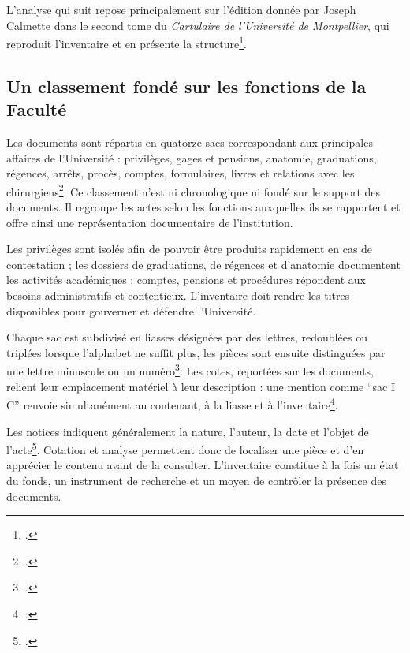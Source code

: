 L'analyse qui suit repose principalement sur l'édition donnée par Joseph Calmette dans le second tome du \emph{Cartulaire de l'Université de Montpellier}, qui reproduit l'inventaire et en présente la structure\footcite[p.~XXII--XXIX et p.~1--206, vues~41 à 51 et 187 à 394 de la version numérisée]{CalmetteCartulaire1912}.

\subsection{Un classement fondé sur les fonctions de la Faculté}

Les documents sont répartis en quatorze sacs correspondant aux principales affaires de l'Université : privilèges, gages et pensions, anatomie, graduations, régences, arrêts, procès, comptes, formulaires, livres et relations avec les chirurgiens\footcite[p.~XXV, vue~47 de la version numérisé]{CalmetteCartulaire1912}. Ce classement n'est ni chronologique ni fondé sur le support des documents. Il regroupe les actes selon les fonctions auxquelles ils se rapportent et offre ainsi une représentation documentaire de l'institution.

Les privilèges sont isolés afin de pouvoir être produits rapidement en cas de contestation ; les dossiers de graduations, de régences et d'anatomie documentent les activités académiques ; comptes, pensions et procédures répondent aux besoins administratifs et contentieux. L'inventaire doit rendre les titres disponibles pour gouverner et défendre l'Université.

Chaque sac est subdivisé en liasses désignées par des lettres, redoublées ou triplées lorsque l'alphabet ne suffit plus, les pièces sont ensuite distinguées par une lettre minuscule ou un numéro\footcite[p.~XXV--XXVI, vues~47 à 48 de la version numérisée]{CalmetteCartulaire1912}. Les cotes, reportées sur les documents, relient leur emplacement matériel à leur description : une mention comme \enquote{sac I C} renvoie simultanément au contenant, à la liasse et à l'inventaire\footcite[p.~XXVI, vue~48 de la version numérisée]{CalmetteCartulaire1912}.

Les notices indiquent généralement la nature, l'auteur, la date et l'objet de l'acte\footcite[p.~XXVIII--XXIX, vues~50 à 51 de la version numérisée]{CalmetteCartulaire1912}. Cotation et analyse permettent donc de localiser une pièce et d'en apprécier le contenu avant de la consulter. L'inventaire constitue à la fois un état du fonds, un instrument de recherche et un moyen de contrôler la présence des documents.

